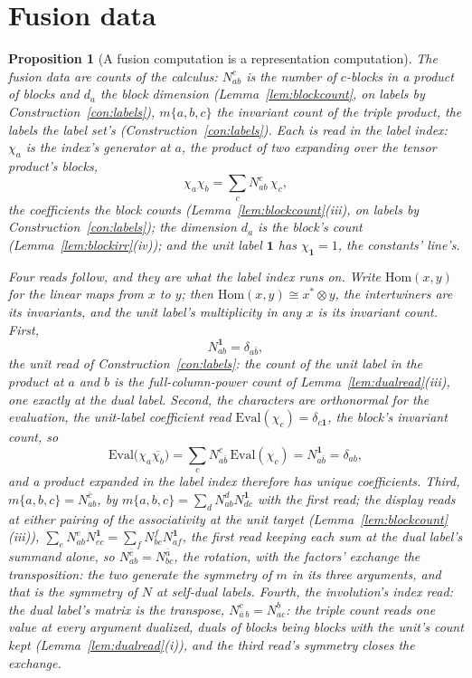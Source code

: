 \documentclass[11pt]{article}
\newtheorem{proposition}{Proposition}
\theoremstyle{definition}
\begin{document}
\section{Fusion data}

\begin{proposition}[A fusion computation is a representation
computation]\label{prop:repring}
The fusion data are counts of the calculus: $N^c_{ab}$ is the number of
$c$-blocks in a product of blocks and $d_a$ the block dimension
(Lemma~\ref{lem:blockcount}, on labels by Construction~\ref{con:labels}),
$m\{a,b,c\}$ the invariant count of the triple product, the labels
the label set's (Construction~\ref{con:labels}). Each is read in the label index: $\chi_a$ is the index's generator at
$a$, the product of two expanding over the tensor product's blocks,
\[
\chi_a\chi_b=\sum_cN^c_{ab}\,\chi_c ,
\]
the coefficients the block counts (Lemma~\ref{lem:blockcount}(iii), on
labels by Construction~\ref{con:labels}); the dimension $d_a$ is the
block's count (Lemma~\ref{lem:blockirr}(iv)); and the unit label
$\mathbf 1$ has $\chi_{\mathbf 1}=1$, the constants' line's.

Four reads follow, and they are what the label index runs on. Write
$\mathrm{Hom}(x,y)$ for the linear maps from $x$ to $y$; then
$\mathrm{Hom}(x,y)\cong x^{*}\otimes y$, the intertwiners are its invariants,
and the unit label's multiplicity in any $x$ is its invariant count.
First,
\[
N^{\mathbf 1}_{ab}=\delta_{a\bar b} ,
\]
the unit read of Construction~\ref{con:labels}: the count of the
unit label in the product at $a$ and $b$ is the full-column-power count
of Lemma~\ref{lem:dualread}(iii), one exactly at the dual label. Second, the characters are orthonormal for the evaluation, the
unit-label coefficient read
$\mathrm{Eval}(\chi_c)=\delta_{c\mathbf 1}$, the block's invariant
count, so
\[
\mathrm{Eval}\big(\chi_a\overline{\chi_b}\big)
=\sum_cN^c_{a\bar b}\,\mathrm{Eval}(\chi_c)
=N^{\mathbf 1}_{a\bar b}=\delta_{ab} ,
\]
and a product expanded in the label index therefore has unique coefficients.
Third, $m\{a,b,c\}=N^{\bar c}_{ab}$, by
$m\{a,b,c\}=\sum_dN^d_{ab}N^{\mathbf 1}_{dc}$ with
the first read; the display reads at either pairing of the
associativity at the unit target
(Lemma~\ref{lem:blockcount}(iii)),
$\sum_eN^e_{ab}N^{\mathbf 1}_{ec}=\sum_fN^f_{bc}N^{\mathbf 1}_{af}$,
the first read keeping each sum at the dual label's summand alone,
so $N^{\bar c}_{ab}=N^{\bar a}_{bc}$, the rotation, with the
factors' exchange the transposition: the two generate the symmetry
of $m$ in its three arguments, and that is the symmetry of $N$ at
self-dual labels. Fourth, the involution's index
read: the dual label's matrix is the transpose,
$N^c_{\bar a\,b}=N^b_{ac}$: the triple count reads one value at
every argument dualized, duals of blocks being blocks with the
unit's count kept (Lemma~\ref{lem:dualread}(i)), and the third
read's symmetry closes the exchange.
\end{proposition}
\end{document}
